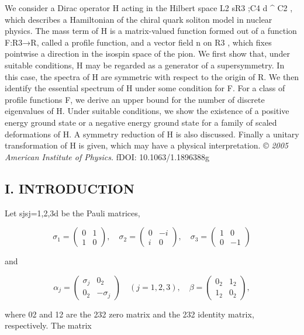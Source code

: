 \documentclass{article}
\begin{document}
We consider a Dirac operator H acting in the Hilbert space L2 sR3 ;C4 d ^ C2 , which describes a Hamiltonian of the chiral quark soliton model in nuclear physics. The mass term of H is a matrix-valued function formed out of a function F:R3→R, called a profile function, and a vector field n on R3 , which fixes pointwise a direction in the isospin space of the pion. We first show that, under suitable conditions, H may be regarded as a generator of a supersymmetry. In this case, the spectra of H are symmetric with respect to the origin of R. We then identify the essential spectrum of H under some condition for F. For a class of profile functions F, we derive an upper bound for the number of discrete eigenvalues of H. Under suitable conditions, we show the existence of a positive energy ground state or a negative energy ground state for a family of scaled deformations of H. A symmetry reduction of H is also discussed. Finally a unitary transformation of H is given, which may have a physical interpretation. © \textit{2005 American Institute of Physics.} fDOI: 10.1063/1.1896388g

\subsection{\textbf{I. INTRODUCTION}}

Let sjsj=1,2,3d be the Pauli matrices,

$$\sigma_{1}{=}\begin{pmatrix}0&1\\ 1&0\end{pmatrix},\quad\sigma_{2}{=}\begin{pmatrix}0&-i\\ i&0\end{pmatrix},\quad\sigma_{3}{=}\begin{pmatrix}1&0\\ 0&-1\end{pmatrix}\tag{1.1}$$

and

$$\alpha_{j}{=}\begin{pmatrix}\sigma_{j}&0_{2}\\ 0_{2}&-\sigma_{j}\end{pmatrix}\quad(j=1,2,3),\quad\beta{=}\begin{pmatrix}0_{2}&1_{2}\\ 1_{2}&0_{2}\end{pmatrix},\tag{1.2}$$

where 02 and 12 are the 232 zero matrix and the 232 identity matrix, respectively. The matrix
\end{document}
